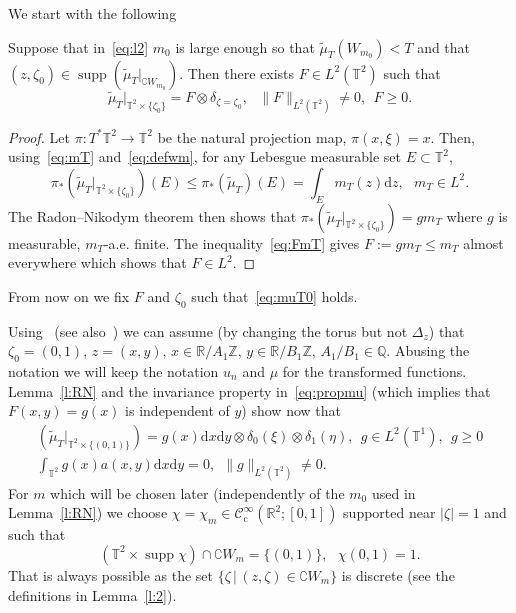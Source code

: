 \documentclass[AHL, Unicode, longabstracts]{cedram}
\DeclareMathOperator{\supp}{supp}
\newcommand{\CIc}{{\mathcal C}^\infty_{\mathrm{c}} }
\newcommand{\R}{{\mathbb R}}
\newcommand{\TT}{{\mathbb T}}
\newcommand{\ZZ}{{\mathbb Z}}
\newcommand{\TT}{{\mathbb T}}
\newcommand{\R}{{\mathbb R}}
\newcommand{\ZZ}{{\mathbb Z}}
\newcommand*{\dd}{\mathrm{d}}
\newcommand*{\dx}{\dd x}
\newcommand*{\dy}{\dd y}
\newcommand*{\dz}{\dd z}
\newcommand*{\tq}{\,|\,}
\begin{document}
We start with the following

\begin{lemm}\label{l:RN}
Suppose that in~\eqref{eq:l2} $ m_0 $ is large enough so that $ \widetilde \mu_T (W_{m_0}) < T $ and that $ (z, \zeta_0) \in \supp (\widetilde \mu_T |_{ \complement W_{m_0} }) $. Then there exists $ F \in L^2 (\TT^2) $ such that
\begin{equation}\label{eq:muT0}
\widetilde \mu_T |_{ \TT^2 \times \{ \zeta_0 \} } = F \otimes \delta_{ \zeta = \zeta_0 }, \ \ \ \| F \|_{ L^2 (\TT^2) } \neq 0, \ \ F \geq 0.
\end{equation}
\end{lemm}

\begin{proof}
Let $ \pi : T^*\TT^2 \to \TT^2 $ be the natural projection map, $ \pi (x, \xi) = x $. Then, using~\eqref{eq:mT} and~\eqref{eq:defwm}, for any Lebesgue measurable set $ E \subset \TT^2 $,
\begin{equation}\label{eq:FmT}
\pi_* (\widetilde \mu_T |_{ \TT^2 \times \{ \zeta_0 \}}) (E)
\leq \pi_* (\widetilde \mu_T) (E) = \int_E m_T (z) \dz, \ \ \ m_T \in L^2.
\end{equation}
The Radon--Nikodym theorem then shows that $ \pi_* (\widetilde \mu_T |_{ \TT^2 \times \{ \zeta_0 \}}) = g m_T $ where $ g $ is measurable, $m_T$-a.e. finite. The inequality~\eqref{eq:FmT} gives $ F := g m_T \leq m_T $ almost everywhere which shows that $ F \in L^2 $.
\end{proof}

From now on we fix $ F $ and $ \zeta_0 $ such that~\eqref{eq:muT0} holds.

Using~\cite[Lemma~2.7]{BZ4} (see also~\cite[Figure~1]{BZ4}) we can assume (by changing the torus but not $ \Delta_z $) that $ \zeta_0 = (0, 1) $, $ z = (x, y) $, $ x \in \R/A_1 \ZZ $, $ y \in \R /B_1 \ZZ $, $ A_1/B_1 \in
\mathbb Q $. Abusing the notation we will keep the notation $ u_n $ and $
\mu $ for the transformed functions. Lemma~\ref{l:RN} and the invariance property in~\eqref{eq:propmu} (which implies that $ F (x, y) = g (x) $ is independent of $ y $) show now that
\begin{equation}\label{eq:muT00}
\begin{gathered}
(\widetilde \mu_T |_{ \TT^2 \times \{ (0,1) \} }) = g (x) \dx\dy \otimes \delta_{0} (\xi) \otimes\delta_1 (\eta), \ \ g \in L^2 (\TT^1), \ \ g \geq 0 \\
\int_{ \TT^2 } g (x) a (x, y) \dx \dy = 0, \ \
\| g \|_{ L^2 (\TT^2)} \neq 0.
\end{gathered}
\end{equation}
For $ m $ which will be chosen later (independently of the $ m_0 $ used in Lemma~\ref{l:RN}) we choose $ \chi = \chi_m \in \CIc (\R^2; [0,1])$ supported near $ | \zeta |= 1 $ and such that
\begin{equation}\label{eq:suppchi}
(\TT^2 \times \supp \chi) \cap \complement W_m = \{ (0, 1) \}, \ \ \ \chi(0,1) = 1.
\end{equation}
That is always possible as the set $ \{\zeta \tq (z, \zeta) \in \complement W_m \} $ is discrete (see the definitions in Lemma~\ref{l:2}).
\end{document}
